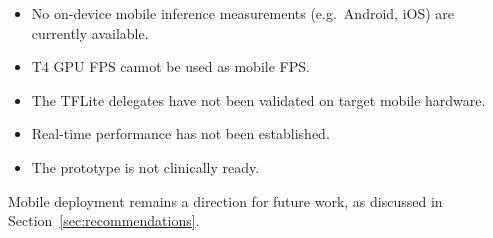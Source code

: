 \begin{itemize}
    \item No on-device mobile inference measurements (e.g.~Android, iOS) are currently available.
    \item T4 GPU FPS cannot be used as mobile FPS.
    \item The TFLite delegates have not been validated on target mobile hardware.
    \item Real-time performance has not been established.
    \item The prototype is not clinically ready.
\end{itemize}

Mobile deployment remains a direction for future work, as discussed in Section~\ref{sec:recommendations}.